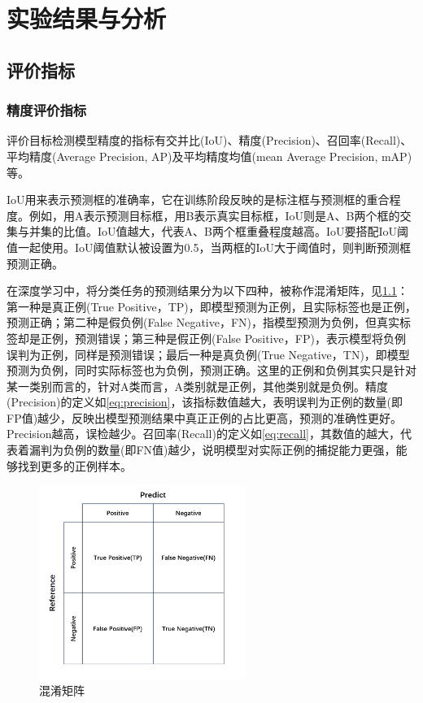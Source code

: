\chapter{实验结果与分析}

\section{评价指标}

\subsection{精度评价指标}
评价目标检测模型精度的指标有交并比(IoU)、精度(Precision)、召回率(Recall)、平均精度(Average Precision, AP)及平均精度均值(mean Average Precision, mAP)等。

IoU用来表示预测框的准确率，它在训练阶段反映的是标注框与预测框的重合程度。例如，用A表示预测目标框，用B表示真实目标框，IoU则是A、B两个框的交集与并集的比值。IoU值越大，代表A、B两个框重叠程度越高。IoU要搭配IoU阈值一起使用。IoU阈值默认被设置为0.5，当两框的IoU大于阈值时，则判断预测框预测正确。

在深度学习中，将分类任务的预测结果分为以下四种，被称作混淆矩阵，见\ref{fig:matrix}：第一种是真正例(True Positive，TP)，即模型预测为正例，且实际标签也是正例，预测正确；第二种是假负例(False Negative，FN)，指模型预测为负例，但真实标签却是正例，预测错误；第三种是假正例(False Positive，FP)，表示模型将负例误判为正例，同样是预测错误；最后一种是真负例(True Negative，TN)，即模型预测为负例，同时实际标签也为负例，预测正确。这里的正例和负例其实只是针对某一类别而言的，针对A类而言，A类别就是正例，其他类别就是负例。精度(Precision)的定义如\ref{eq:precision}，该指标数值越大，表明误判为正例的数量(即FP值)越少，反映出模型预测结果中真正正例的占比更高，预测的准确性更好。Precision越高，误检越少。召回率(Recall)的定义如\ref{eq:recall}，其数值的越大，代表着漏判为负例的数量(即FN值)越少，说明模型对实际正例的捕捉能力更强，能够找到更多的正例样本。

\begin{figure}[!htb]
    \centering
    \includegraphics[width=0.6\textwidth]{figs/chap04/matrix.png}
    \caption{混淆矩阵}
    \label{fig:matrix}
  \end{figure}


